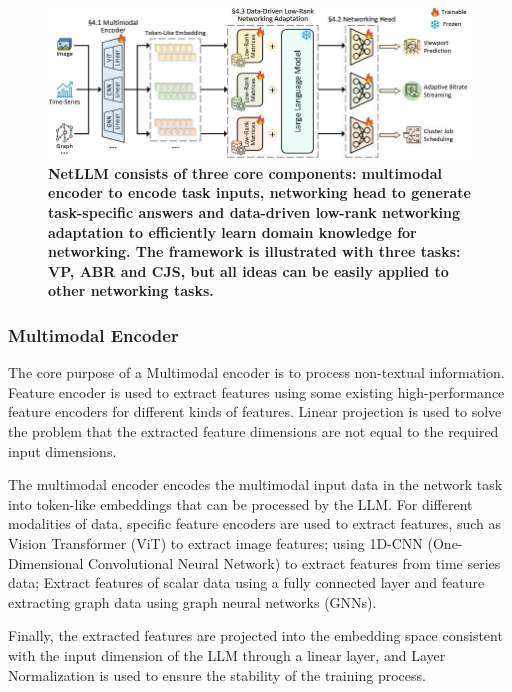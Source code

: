 \documentclass[twocolumn]{article}
\begin{document}
\begin{figure}[t]
  \centering
  \includegraphics[width=1\linewidth]{img/figure8.jpg}
  \caption{\textbf{NetLLM consists of three core components: multimodal encoder to encode task inputs, networking head to generate task-specific answers and data-driven low-rank networking adaptation to efficiently learn domain knowledge for networking. The framework is illustrated with three tasks: VP, ABR and CJS, but all ideas can be easily applied to other networking tasks.}}
  \label{fig:7}
\end{figure}

\subsubsection{Multimodal Encoder}
The core purpose of a Multimodal encoder is to process non-textual information. Feature encoder is used to extract features using some existing high-performance feature encoders for different kinds of features. Linear projection is used to solve the problem that the extracted feature dimensions are not equal to the required input dimensions. 

The multimodal encoder encodes the multimodal input data in the network task into token-like embeddings that can be processed by the LLM. For different modalities of data, specific feature encoders are used to extract features, such as Vision Transformer (ViT) to extract image features; using 1D-CNN (One-Dimensional Convolutional Neural Network) to extract features from time series data; Extract features of scalar data using a fully connected layer and feature extracting graph data using graph neural networks (GNNs).

Finally, the extracted features are projected into the embedding space consistent with the input dimension of the LLM through a linear layer, and Layer Normalization is used to ensure the stability of the training process.
\end{document}
